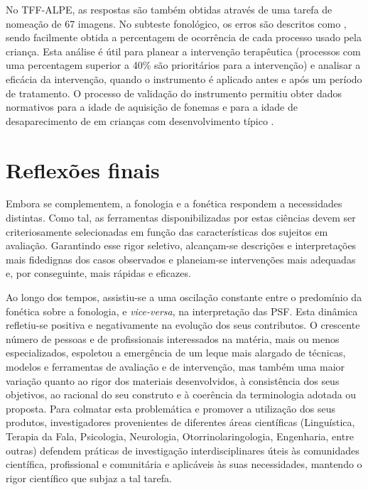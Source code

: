 \documentclass[output=paper]{LSP/langsci}
\begin{document}
No TFF-ALPE, as respostas são também obtidas através de uma tarefa de nomeação de 67 imagens. No subteste fonológico, os erros são descritos como , sendo facilmente obtida a percentagem de ocorrência de cada processo usado pela criança. Esta análise é útil para planear a intervenção terapêutica (processos com uma percentagem superior a 40\% são prioritários para a intervenção) e analisar a eficácia da intervenção, quando o instrumento é aplicado antes e após um período de tratamento. O processo de validação do instrumento permitiu obter dados normativos para a idade de aquisição de fonemas e para a idade de desaparecimento de  em crianças com desenvolvimento típico \citep{lousada_etal2012,mendes_etal2013}. 

\section{Reflexões finais}
\label{sec:lousada_conclusao}

Embora se complementem, a fonologia e a fonética respondem a necessidades distintas. Como tal, as ferramentas disponibilizadas por estas ciências devem ser criteriosamente selecionadas em função das características dos sujeitos em avaliação. Garantindo esse rigor seletivo, alcançam-se descrições e interpretações mais fidedignas dos casos observados e planeiam-se intervenções mais adequadas e, por conseguinte, mais rápidas e eficazes.

Ao longo dos tempos, assistiu-se a uma oscilação constante entre o predomínio da fonética sobre a fonologia, e \textit{vice-versa}, na interpretação das PSF. Esta dinâmica refletiu-se positiva e negativamente na evolução dos seus contributos. O crescente número de pessoas e de profissionais interessados na matéria, mais ou menos especializados, espoletou a emergência de um leque mais alargado de técnicas, modelos e ferramentas de avaliação e de intervenção, mas também uma maior variação quanto ao rigor dos materiais desenvolvidos, à consistência dos seus objetivos, ao racional do seu construto e à coerência da terminologia adotada ou proposta. Para colmatar esta problemática e promover a utilização dos seus produtos, investigadores provenientes de diferentes áreas científicas (Linguística, Terapia da Fala, Psicologia, Neurologia, Otorrinolaringologia, Engenharia, entre outras) defendem práticas de investigação interdisciplinares úteis às comunidades científica, profissional e comunitária e aplicáveis às suas necessidades, mantendo o rigor científico que subjaz a tal tarefa. 





{\sloppy
\printbibliography[heading=subbibliography,notkeyword=this]
}
\end{document}
